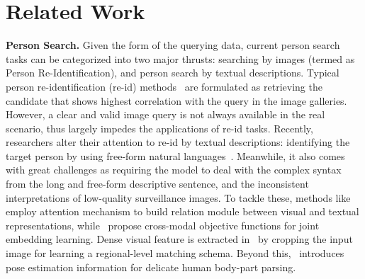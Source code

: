 \documentclass[runningheads]{llncs}
\begin{document}
\section{Related Work}
\textbf{Person Search.} Given the form of the querying data, current person search tasks can be categorized into two major thrusts: searching by images (termed as Person Re-Identification), and person search by textual descriptions. Typical person re-identification (re-id) methods~\cite{Gong:2014:PR:2584512,li2014deepreid,zheng2015scalable} are formulated as retrieving the candidate that shows highest correlation with the query in the image galleries. However, a clear and valid image query is not always available in the real scenario, thus largely impedes the applications of re-id tasks.
Recently, researchers alter their attention to re-id by textual descriptions: identifying the target person by using free-form natural languages~\cite{li2017person,li2017identity,chen2018improving}. Meanwhile, it also comes with great challenges as requiring the model to deal with the complex syntax from the long and free-form descriptive sentence, and the inconsistent interpretations of low-quality surveillance images. To tackle these, methods like~\cite{li2017person,li2017identity,8354312} employ attention mechanism to build relation module between visual and textual representations, while~\cite{zhang2018deep,zheng2017dual} propose cross-modal objective functions for joint embedding learning. Dense visual feature is extracted in~\cite{niu2019improving} by cropping the input image for learning a regional-level matching schema. Beyond this,~\cite{jing2018pose} introduces pose estimation information for delicate human body-part parsing.
\end{document}
